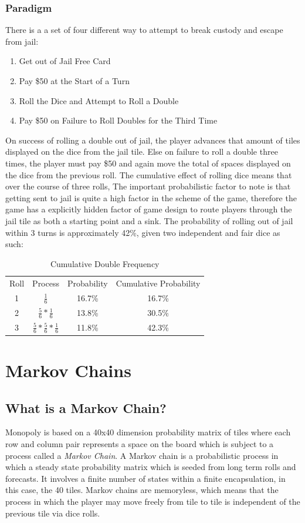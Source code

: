 \documentclass[12pt]{article}
\begin{document}
\subsubsection{Paradigm}
There is a a set of four different way to attempt to break custody and escape from jail:
\begin{enumerate}
  \item {Get out of Jail Free Card}\hfill
  \item {Pay \$50 at the Start of a Turn}\hfill
  \item {Roll the Dice and Attempt to Roll a Double} \hfill
  \item {Pay \$50 on Failure to Roll Doubles for the Third Time} \hfill
\end{enumerate}
On success of rolling a double out of jail, the player advances that amount of tiles displayed on the dice from the jail tile. Else on failure to roll a double three times, the player must pay \$50 and again move the total of spaces displayed on the dice from the previous roll. 
The cumulative effect of rolling dice means that over the course of three rolls, 
The important probabilistic factor to note is that getting sent to jail is quite a high factor in the scheme of the game, therefore the game has a explicitly hidden factor of game design to route players through the jail tile as both a starting point and a sink.
The probability of rolling out of jail within 3 turns is approximately 42\%, given two independent and fair dice as such:
\begin{table}[h]
\centering
\label{my-label}
\begin{tabular}{cccc}
Roll & Process              & Probability & Cumulative Probability \\
1    & $\frac{1}{6}$                  & 16.7\%        & 16.7\%                   \\
2    & $\frac{5}{6}*\frac{1}{6}$         & 13.8\%        & 30.5\%                   \\
3    & $\frac{5}{6}*\frac{5}{6}*\frac{1}{6}$ & 11.8\%        & 42.3\%                  
\end{tabular}
\caption{Cumulative Double Frequency}
\end{table}
\section{Markov Chains}
\subsection{What is a Markov Chain?}
Monopoly is based on a 40x40 dimension probability matrix of tiles where each row and column pair represents a space on the board which is subject to a process called a \emph{Markov Chain}.
A Markov chain is a probabilistic process in which a steady state probability matrix which is seeded from long term rolls and forecasts. It involves a finite number of states within a finite encapsulation, in this case, the 40 tiles. Markov chains are memoryless, which means that the process in which the player may move freely from tile to tile is independent of the previous tile via dice rolls.
\end{document}
